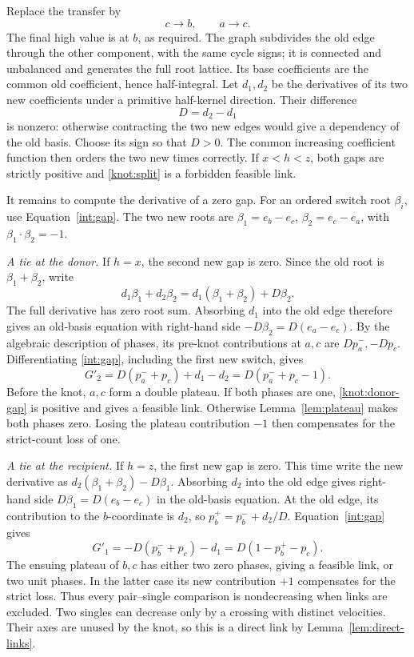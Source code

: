 Replace the transfer by
\begin{equation}\label{knot:split}
 c\longrightarrow b,\qquad a\longrightarrow c.
\end{equation}
The final high value is at \(b\), as required.  The graph subdivides
the old edge through the other component, with the same cycle signs;
it is connected and unbalanced and generates the full root lattice.
Its base coefficients are the common old coefficient, hence
half-integral.  Let \(d_1,d_2\) be the derivatives of its two new
coefficients under a primitive half-kernel direction.  Their difference
\[
 D=d_2-d_1
\]
is nonzero: otherwise contracting the two new edges would give a
dependency of the old basis.  Choose its sign so that \(D>0\).
The common increasing coefficient function then orders the two new
times correctly.  If \(x<h<z\), both gaps are strictly positive and
\eqref{knot:split} is a forbidden feasible link.

It remains to compute the derivative of a zero gap.  For an ordered
switch root \(\beta_i\), use Equation~\eqref{int:gap}.
The two new roots are
\(\beta_1=e_b-e_c\), \(\beta_2=e_c-e_a\), with
\(\beta_1\cdot\beta_2=-1\).

\emph{A tie at the donor.}
If \(h=x\), the second new gap is zero.  Since the old root is
\(\beta_1+\beta_2\), write
\[
 d_1\beta_1+d_2\beta_2
 =d_1(\beta_1+\beta_2)+D\beta_2.
\]
The full derivative has zero root sum.  Absorbing \(d_1\) into the
old edge therefore gives an old-basis equation with right-hand side
\(-D\beta_2=D(e_a-e_c)\).  By the algebraic description of phases, its
pre-knot contributions at \(a,c\) are \(Dp_a^-,-Dp_c\).
Differentiating \eqref{int:gap}, including the first new
switch, gives
\begin{equation}\label{knot:donor-gap}
 G'_2=D(p_a^-+p_c)+d_1-d_2
      =D(p_a^-+p_c-1).
\end{equation}
Before the knot, \(a,c\) form a double plateau.  If both phases are
one, \eqref{knot:donor-gap} is positive and gives a feasible link.
Otherwise Lemma~\ref{lem:plateau} makes both phases zero.  Losing the
plateau contribution \(-1\) then compensates for the strict-count
loss of one.

\emph{A tie at the recipient.}
If \(h=z\), the first new gap is zero.  This time write the new
derivative as \(d_2(\beta_1+\beta_2)-D\beta_1\).
Absorbing \(d_2\) into the old edge gives right-hand side
\(D\beta_1=D(e_b-e_c)\) in the old-basis equation.  At the old edge,
its contribution to the \(b\)-coordinate is \(d_2\), so
\(p_b^+=p_b^-+d_2/D\).  Equation~\eqref{int:gap} gives
\begin{equation}\label{knot:recipient-gap}
 G'_1=-D(p_b^-+p_c)-d_1
      =D(1-p_b^+-p_c).
\end{equation}
The ensuing plateau of \(b,c\) has either two zero phases, giving
a feasible link, or two unit phases.  In the latter case its new
contribution \(+1\) compensates for the strict loss.  Thus every
pair--single comparison is nondecreasing when links are excluded.
Two singles can decrease only by a crossing with distinct velocities.
Their axes are unused by the knot, so this is a direct link by
Lemma~\ref{lem:direct-links}.

